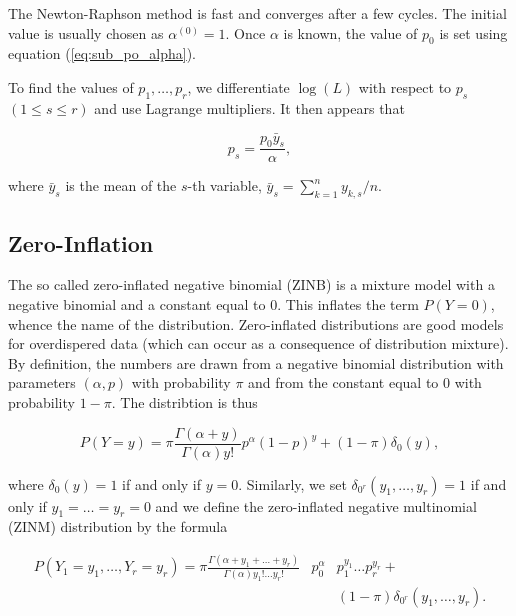 \documentclass[12pt]{article}
\begin{document}
    The Newton-Raphson method is fast and converges after a few
    cycles. The initial value is usually chosen as
    $\alpha^{(0)} = 1$.
    Once $\alpha$ is known, the value of $p_0$ is set using
    equation (\ref{eq:sub_po_alpha}).

    To find the values of $p_1, \ldots, p_r$, we differentiate
    $\log(L)$ with respect to $p_s$ $(1 \leq s \leq r)$ and use
    Lagrange multipliers. It then appears that

    \begin{equation}
      p_s = \frac{p_0 \bar{y}_s}{\alpha},
    \end{equation}

    \noindent
    where $\bar{y}_s$ is the mean of the $s$-th variable,
    $\bar{y}_s = \sum_{k=1}^n y_{k,s}/n$.

\subsection{Zero-Inflation}

    The so called zero-inflated negative binomial (ZINB) is a mixture
    model with a negative binomial and a constant equal to 0. This 
    inflates the term $P(Y=0)$, whence the name of the distribution.
    Zero-inflated distributions are good models for overdispered
    data (which can occur as a consequence of distribution mixture).
    By definition, the numbers are drawn from a negative binomial
    distribution with parameters $(\alpha, p)$ with probability
    $\pi$ and from the constant equal to 0 with probability
    $1-\pi$. The distribtion is thus

    \begin{equation*}
    P(Y = y) = \pi\frac{\Gamma(\alpha+y)}{\Gamma(\alpha)y!}
    p^{\alpha}(1-p)^y + (1-\pi)\delta_0(y),
    \end{equation*}

    \noindent
    where $\delta_0(y) = 1$ if and only if $y=0$. Similarly,
    we set $\delta_{0^r}(y_1, \ldots, y_r) = 1$ if and only
    if $y_1=\ldots =y_r = 0$ and we define the zero-inflated negative
    multinomial (ZINM) distribution by the formula

    \begin{eqnarray}
      P(Y_1 = y_1, \ldots, Y_r = y_r) = \pi
       \frac{\Gamma(\alpha+y_1+\ldots+y_r)}
       {\Gamma(\alpha)y_1!\ldots y_r!}
\label{eq:zinm}
       &p_0^{\alpha}& p_1^{y_1} \ldots p_r^{y_r} + \\
       &\;& (1-\pi)\delta_{0^r}(y_1, \ldots, y_r). \nonumber
    \end{eqnarray}
\end{document}
